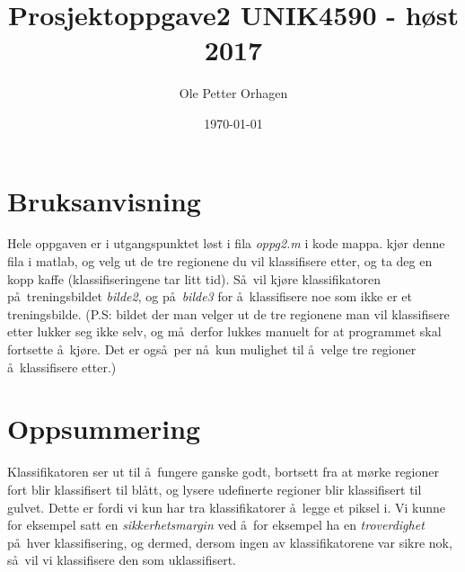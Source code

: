 \documentclass[10pt,a4paper,sans]{article}
\title{Prosjektoppgave2 UNIK4590 - h\o st 2017}
\author{Ole Petter Orhagen}
\date{\today}
\begin{document}
\maketitle
\newpage

\section*{Bruksanvisning}
Hele oppgaven er i utgangspunktet l\o st i fila \emph{oppg2.m} i kode mappa.
kj\o r denne fila i matlab, og velg ut de tre regionene du vil klassifisere
etter, og ta deg en kopp kaffe (klassifiseringene tar litt tid). S\aa\ vil kj\o re klassifikatoren p\aa\ treningsbildet \emph{bilde2}, og
p\aa\ \emph{bilde3} for \aa\ klassifisere noe som ikke er et treningsbilde.
(P.S: bildet der man velger ut de tre regionene man vil klassifisere etter
lukker seg ikke selv, og m\aa\ derfor lukkes manuelt for at programmet skal
fortsette \aa\ kj\o re. Det er ogs\aa\ per n\aa\ kun mulighet til \aa\ velge tre
regioner \aa\ klassifisere etter.)

\section*{Oppsummering}
Klassifikatoren ser ut til \aa\ fungere ganske godt, bortsett fra at m\o rke
regioner fort blir klassifisert til bl\aa tt, og lysere udefinerte regioner blir
klassifisert til gulvet. Dette er fordi vi kun har tra klassifikatorer \aa\
legge et piksel i. Vi kunne for eksempel satt en \emph{sikkerhetsmargin} ved \aa\ for
eksempel ha en \emph{troverdighet} p\aa\ hver klassifisering, og dermed, dersom
ingen av klassifikatorene var sikre nok, s\aa\ vil vi klassifisere den som uklassifisert.
\end{document}
